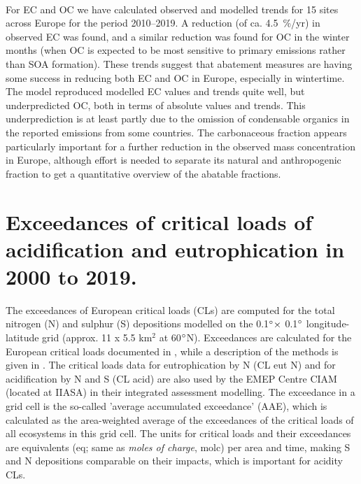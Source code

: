 \\

For EC and OC we have calculated observed and modelled trends for 15 sites across Europe for the period 2010--2019. A reduction (of ca. 4.5~\%/yr) in observed EC was found, and a similar reduction was found for OC in the winter months (when OC is expected to be most sensitive to primary emissions rather than SOA formation). These trends suggest that abatement measures are having some success in reducing both EC and OC in Europe, especially in wintertime.  The model reproduced modelled EC values and trends quite well, but underpredicted OC, both in terms of absolute values and trends. This underprediction is at least partly due to the omission of condensable organics in the reported emissions from some countries. 
%
The carbonaceous fraction appears particularly important for a
further reduction in the observed \pmfine mass concentration in Europe,
although effort is needed to separate its natural and anthropogenic
fraction to get a quantitative overview of the abatable fractions.



\clearpage
\section{Exceedances of critical loads of acidification and eutrophication in 2000 to 2019.}
\label{subs:exceedSnN}

The exceedances of European critical loads (CLs) are computed for the total nitrogen
(N) and sulphur (S) depositions modelled on the 0.1$^\circ \times$ 0.1$^\circ$
longitude-latitude grid (approx. 11 x 5.5 km$^{2}$ at 60$^\circ$N).
Exceedances are calculated for the European critical loads documented in \cite{Hettelingh:2017}, while
a description of the methods is given in \cite{DeVries:2015}. The
critical loads data for eutrophication by N (CL eut N) and for acidification by N and S
(CL acid) are also used by the EMEP Centre CIAM (located at IIASA) in their integrated assessment
modelling. The exceedance in a grid cell is the so-called ’average accumulated
exceedance’ (AAE), which is calculated as the area-weighted average of the
exceedances of the critical loads of all ecosystems in this grid cell. The units for
critical loads and their exceedances are equivalents (eq; same as \textit{moles of charge},
molc) per area and time, making S and N depositions comparable on their impacts, which is important for
acidity CLs.

